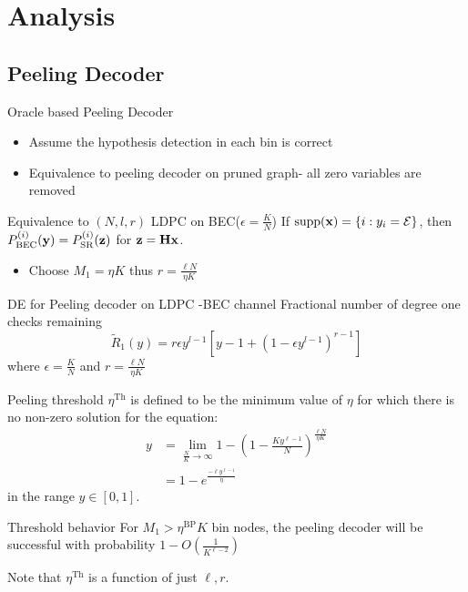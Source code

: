 \documentclass[10pt]{beamer}
\begin{document}
\section{Analysis}
\subsection{Peeling Decoder}
\begin{frame}{Oracle based Peeling Decoder}
\begin{itemize}
\item Assume the hypothesis detection in each bin is correct
\item Equivalence to peeling decoder on pruned graph- all zero variables are removed
\end{itemize}
\begin{block}{Equivalence to $(N,l,r)$ LDPC on BEC($\epsilon=\frac{K}{N}$)}
If $\text{supp}(\mathbf{x})=\{i:y_i=\mathcal{E}\}$, then $P^{(i)}_{\text{BEC}}(\mathbf{y})=P^{(i)}_{\text{SR}}(\mathbf{z})$  for $\mathbf{z=Hx}$.
\end{block}
\begin{itemize}
\item Choose $M_1=\eta K$ thus $r=\frac{\ell N}{\eta K}$
\end{itemize}
\vspace{1ex}
\begin{block}{DE for Peeling decoder on LDPC -BEC channel}
Fractional number of degree one checks remaining
\begin{equation*}
\tilde{R}_1(y)=r\epsilon y^{l-1}[y-1+(1-\epsilon y^{l-1})^{r-1}]
\end{equation*}
where $\epsilon=\frac{K}{N}$ and $r=\frac{\ell N}{\eta K}$
\end{block}
\end{frame}

\begin{frame}{}
\begin{block}{Peeling threshold}
$\eta^{\text{Th}}$ is defined to be the minimum value of $\eta$ for which there is no non-zero solution for the equation:
\begin{align*}
y&=\lim_{\frac{N}{K}\rightarrow\infty}1-\left(1-\frac{Ky^{\ell-1}}{N}\right)^{\frac{\ell N}{\eta K}}\\
  &=1-e^{\frac{-\ell y^{\ell-1}}{\eta}}
\end{align*}
in the range $y\in [0,1]$.
\end{block}
\vspace{3ex}
\begin{block}{Threshold behavior}
For $M_1>\eta^{\text{BP}}K$ bin nodes, the peeling decoder will be successful with probability $1-O\left(\frac{1}{K^{\ell-2}}\right)$
\end{block}
Note that $\eta^{\text{Th}}$ is a function of just $\ell,r$.
\end{frame}
\end{document}

